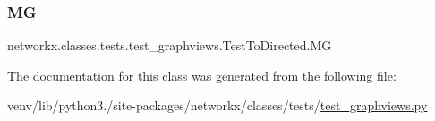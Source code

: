 \subsubsection{\texorpdfstring{MG}{MG}}
{\footnotesize\ttfamily networkx.\+classes.\+tests.\+test\+\_\+graphviews.\+Test\+To\+Directed.\+MG}



The documentation for this class was generated from the following file\+:\begin{DoxyCompactItemize}
\item 
venv/lib/python3./site-\/packages/networkx/classes/tests/\hyperlink{test__graphviews_8py}{test\+\_\+graphviews.\+py}\end{DoxyCompactItemize}
